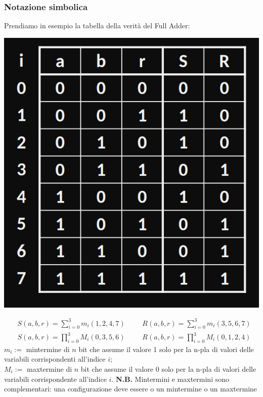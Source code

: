 \documentclass{article}
\begin{document}
\subsubsection{Notazione simbolica}
Prendiamo in esempio la tabella della verità del Full Adder:
\begin{center}
\includegraphics[scale=0.27]{fulladderTdv.png}
\end{center}
\begin{align*}
    &S(a,b,r) = \sum_{i=0}^3 m_i(1,2,4,7) && &R(a,b,r) = \sum_{i=0}^3 m_i (3,5,6,7)\\
    &S(a,b,r) = \prod_{i=0}^3 M_i (0,3,5,6) && &R(a,b,r) = \prod_{i=0}^3 M_i(0,1,2,4)
\end{align*}
$m_i :=$ mintermine di $n$ bit che assume il valore 1 solo per la n-pla di valori delle variabili corrispondenti all'indice $i$;\\
$M_i :=$ maxtermine di $n$ bit che assume il valore 0 solo per la n-pla di valori delle variabili corrispondente all'indice $i$.
\textbf{N.B.} Mintermini e maxtermini sono complementari: una configurazione deve essere o un mintermine o un maxtermine
\end{document}
